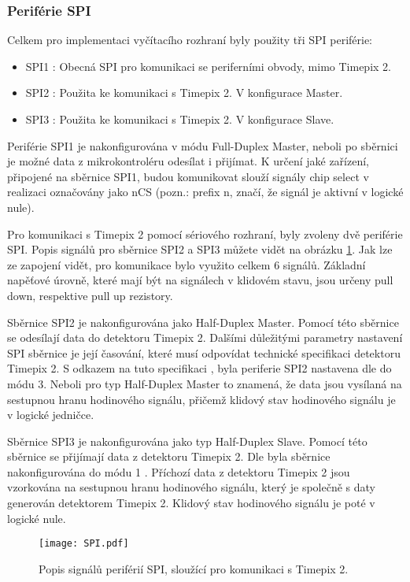 	\subsubsection{Periférie SPI}
	Celkem pro implementaci vyčítacího rozhraní byly použity tři SPI periférie:
	 \begin{itemize}
	 	\setlength\itemsep{0.005em}
	 	\item SPI1 : Obecná SPI pro komunikaci se periferními obvody, mimo Timepix 2.
	 	\item SPI2 : Použita ke komunikaci s Timepix 2. V konfigurace Master. 
	 	\item SPI3 : Použita ke komunikaci s Timepix 2. V konfigurace Slave.
	 \end{itemize}
 	Periférie SPI1 je nakonfigurována v módu Full-Duplex Master, neboli po sběrnici je možné data z mikrokontroléru odesílat i přijímat. K určení jaké zařízení, připojené na sběrnice SPI1, budou komunikovat slouží signály chip select v realizaci označovány jako nCS (pozn.: prefix n, značí, že signál je aktivní v logické nule). 
 	\par Pro komunikaci s Timepix 2 pomocí sériového rozhraní, byly zvoleny dvě periférie SPI. Popis signálů pro sběrnice SPI2 a SPI3 můžete vidět na obrázku \ref{fig:SPI}. Jak lze ze zapojení vidět, pro komunikace bylo využito celkem 6 signálů. Základní napěťové úrovně, které mají být na signálech v klidovém stavu, jsou určeny pull down, respektive pull up rezistory. 
 	\par Sběrnice SPI2 je nakonfigurována jako Half-Duplex Master. Pomocí této sběrnice se odesílají data do detektoru Timepix 2. Dalšími důležitými parametry nastavení SPI sběrnice je její časování, které musí odpovídat technické specifikaci detektoru Timepix 2. S odkazem na tuto specifikaci \cite{Timepix2}, byla periferie SPI2 nastavena dle \cite{SPI} do módu 3. Neboli pro typ Half-Duplex Master to znamená, že data jsou vysílaná na sestupnou hranu hodinového signálu, přičemž klidový stav hodinového signálu je v logické jedničce.
 	\par Sběrnice SPI3 je nakonfigurována jako typ Half-Duplex Slave. Pomocí této sběrnice se přijímají data z detektoru Timepix 2. Dle \cite{Timepix2} byla sběrnice nakonfigurována do módu 1 \cite{SPI}. Příchozí data z detektoru Timepix 2 jsou vzorkována na sestupnou hranu hodinového signálu, který je společně s daty generován detektorem Timepix 2. Klidový stav hodinového signálu je poté v logické nule.
	\begin{figure}[h!]
 		\centering
 		\captionsetup{justification=centering}
 		\texttt{[image: SPI.pdf]}
 		\caption{Popis signálů periférií SPI, sloužící pro komunikaci s Timepix 2.} 
 		\label{fig:SPI}
 	\end{figure}
 	
